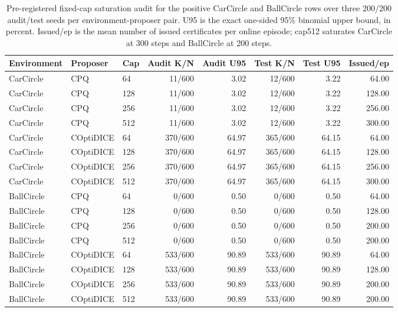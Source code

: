 \documentclass[letterpaper]{article}
\begin{document}
\begin{table}[t]
\centering
\scriptsize
\setlength{\tabcolsep}{3.5pt}
\begin{tabular}{lllrrrrr}
\toprule
Environment & Proposer & Cap & Audit K/N & Audit U95 & Test K/N & Test U95 & Issued/ep \\
\midrule
CarCircle & CPQ & 64 & 11/600 & 3.02 & 12/600 & 3.22 & 64.00 \\
CarCircle & CPQ & 128 & 11/600 & 3.02 & 12/600 & 3.22 & 128.00 \\
CarCircle & CPQ & 256 & 11/600 & 3.02 & 12/600 & 3.22 & 256.00 \\
CarCircle & CPQ & 512 & 11/600 & 3.02 & 12/600 & 3.22 & 300.00 \\
CarCircle & COptiDICE & 64 & 370/600 & 64.97 & 365/600 & 64.15 & 64.00 \\
CarCircle & COptiDICE & 128 & 370/600 & 64.97 & 365/600 & 64.15 & 128.00 \\
CarCircle & COptiDICE & 256 & 370/600 & 64.97 & 365/600 & 64.15 & 256.00 \\
CarCircle & COptiDICE & 512 & 370/600 & 64.97 & 365/600 & 64.15 & 300.00 \\
\midrule
BallCircle & CPQ & 64 & 0/600 & 0.50 & 0/600 & 0.50 & 64.00 \\
BallCircle & CPQ & 128 & 0/600 & 0.50 & 0/600 & 0.50 & 128.00 \\
BallCircle & CPQ & 256 & 0/600 & 0.50 & 0/600 & 0.50 & 200.00 \\
BallCircle & CPQ & 512 & 0/600 & 0.50 & 0/600 & 0.50 & 200.00 \\
BallCircle & COptiDICE & 64 & 533/600 & 90.89 & 533/600 & 90.89 & 64.00 \\
BallCircle & COptiDICE & 128 & 533/600 & 90.89 & 533/600 & 90.89 & 128.00 \\
BallCircle & COptiDICE & 256 & 533/600 & 90.89 & 533/600 & 90.89 & 200.00 \\
BallCircle & COptiDICE & 512 & 533/600 & 90.89 & 533/600 & 90.89 & 200.00 \\
\bottomrule
\end{tabular}
\caption{Pre-registered fixed-cap saturation audit for the positive
CarCircle and BallCircle rows over three 200/200 audit/test seeds per
environment-proposer pair. U95 is the exact one-sided 95\% binomial upper
bound, in percent. Issued/ep is the mean number of issued certificates per
online episode; cap512 saturates CarCircle at 300 steps and BallCircle at 200
steps.}
\label{tab:app-closed-loop}
\end{table}
\end{document}
